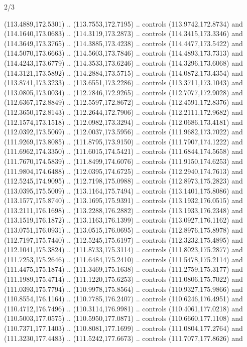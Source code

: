 \begin{flagdescription}{2/3}
\begin{scope}[shift={(0.5\flaglength,0.5)},scale=\flagwidth/320]
\begin{scope}[y=0.8pt, x=0.8pt, yscale=-1,shift={(-118.3,-146)}]
  (113.4889,172.5301) .. (113.7553,172.7195) .. controls (113.9742,172.8734) and
  (114.1640,173.0683) .. (114.3119,173.2873) .. controls (114.3415,173.3346) and
  (114.3649,173.3765) .. (114.3885,173.4238) .. controls (114.4477,173.5422) and
  (114.5070,173.6663) .. (114.5603,173.7846) .. controls (114.4893,173.7313) and
  (114.4243,173.6779) .. (114.3533,173.6246) .. controls (114.3296,173.6068) and
  (114.3121,173.5892) .. (114.2884,173.5715) .. controls (114.0872,173.4354) and
  (113.8741,173.3233) .. (113.6551,173.2286) .. controls (113.3711,173.1043) and
  (113.0805,173.0034) .. (112.7846,172.9265) .. controls (112.7077,172.9028) and
  (112.6367,172.8849) .. (112.5597,172.8672) .. controls (112.4591,172.8376) and
  (112.3650,172.8143) .. (112.2644,172.7906) .. controls (112.2111,172.9682) and
  (112.1574,173.1518) .. (112.0982,173.3294) .. controls (112.0686,173.4181) and
  (112.0392,173.5069) .. (112.0037,173.5956) .. controls (111.9682,173.7022) and
  (111.9269,173.8085) .. (111.8795,173.9150) .. controls (111.7907,174.1222) and
  (111.6962,174.3350) .. (111.6015,174.5421) .. controls (111.6844,174.5658) and
  (111.7670,174.5839) .. (111.8499,174.6076) .. controls (111.9150,174.6253) and
  (111.9804,174.6488) .. (112.0395,174.6725) .. controls (112.2940,174.7613) and
  (112.5245,174.9095) .. (112.7198,175.0988) .. controls (112.8973,175.2823) and
  (113.0395,175.5009) .. (113.1164,175.7494) .. controls (113.1401,175.8086) and
  (113.1577,175.8740) .. (113.1695,175.9391) .. controls (113.1932,176.0515) and
  (113.2111,176.1698) .. (113.2288,176.2882) .. controls (113.1933,176.2348) and
  (113.1519,176.1872) .. (113.1163,176.1399) .. controls (113.0927,176.1162) and
  (113.0751,176.0931) .. (113.0515,176.0695) .. controls (112.8976,175.8978) and
  (112.7197,175.7440) .. (112.5245,175.6197) .. controls (112.3232,175.4895) and
  (112.1041,175.3824) .. (111.8733,175.3114) .. controls (111.8023,175.2877) and
  (111.7253,175.2646) .. (111.6484,175.2410) .. controls (111.5478,175.2114) and
  (111.4475,175.1874) .. (111.3469,175.1638) .. controls (111.2759,175.3177) and
  (111.1989,175.4714) .. (111.1220,175.6253) .. controls (111.0806,175.7022) and
  (111.0393,175.7794) .. (110.9978,175.8564) .. controls (110.9327,175.9866) and
  (110.8554,176.1164) .. (110.7785,176.2407) .. controls (110.6246,176.4951) and
  (110.4712,176.7496) .. (110.3114,176.9981) .. controls (110.4061,177.0218) and
  (110.5003,177.0575) .. (110.5950,177.0871) .. controls (110.6660,177.1108) and
  (110.7371,177.1403) .. (110.8081,177.1699) .. controls (111.0804,177.2764) and
  (111.3230,177.4483) .. (111.5242,177.6673) .. controls (111.7077,177.8626) and

\end{scope}
\end{scope}
\end{flagdescription}
